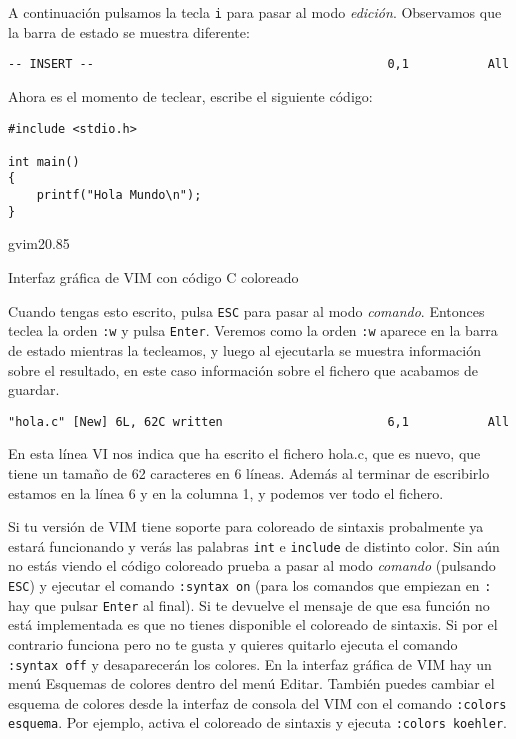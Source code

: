 A  continuación pulsamos  la tecla  {\tt i}  para pasar  al modo  {\em
edición}. Observamos que la barra de estado se muestra diferente:

\begin{verbatim}
-- INSERT --                                         0,1           All
\end{verbatim}

Ahora es el momento de teclear, escribe el siguiente código:

\begin{verbatim}
#include <stdio.h>

int main()
{
    printf("Hola Mundo\n");
}
\end{verbatim}

\begin{figura}{gvim2}{0.85}
\caption{Interfaz gráfica de VIM con código C coloreado}
\end{figura}

Cuando tengas  esto escrito, pulsa {\tt  ESC} para pasar al  modo {\em
comando}.  Entonces teclea  la orden  {\tt  :w} y  pulsa {\tt  Enter}.
Veremos como la orden {\tt :w}  aparece en la barra de estado mientras
la tecleamos,  y luego al  ejecutarla se muestra información  sobre el
resultado, en este  caso información sobre el fichero  que acabamos de
guardar.

\begin{verbatim}
"hola.c" [New] 6L, 62C written                       6,1           All
\end{verbatim}

En esta  línea {\sf VI} nos  indica que ha escrito  el fichero hola.c,
que es nuevo, que tiene un tamaño de 62 caracteres en 6 líneas. Además
al terminar de escribirlo  estamos en la línea 6 y en  la columna 1, y
podemos ver todo el fichero.

Si tu  versión de {\sf VIM}  tiene soporte para coloreado  de sintaxis
probalmente ya  estará funcionando  y verás las  palabras {\tt  int} e
{\tt include}  de distinto color.  Sin aún  no estás viendo  el código
coloreado prueba a pasar al modo  {\em comando} (pulsando {\tt ESC}) y
ejecutar el comando  {\tt :syntax on} (para los  comandos que empiezan
en {\tt  :} hay que  pulsar {\tt Enter} al  final). Si te  devuelve el
mensaje  de que  esa función  no está  implementada es  que no  tienes
disponible el coloreado de sintaxis. Si por el contrario funciona pero
no te gusta y quieres quitarlo  ejecuta el comando {\tt :syntax off} y
desaparecerán los colores. En la interfaz  gráfica de {\sf VIM} hay un
menú {\sf Esquemas  de colores} dentro del menú  {\sf Editar}. También
puedes cambiar el esquema de colores  desde la interfaz de consola del
{\sf VIM} con el comando {\tt :colors esquema}. Por ejemplo, activa el
coloreado de sintaxis y ejecuta {\tt :colors koehler}.

